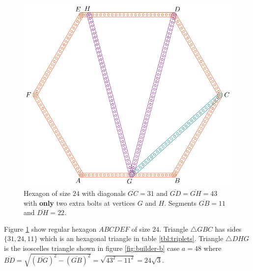 \documentclass[11pt]{article}
\begin{document}
\begin{figure}[H]
\centering
\includegraphics[scale=0.9]{24/hexa-24a}
\caption{Hexagon of size $24$ with diagonals $\overline{GC} = 31$ and $\overline{GD} = \overline{GH} = 43$ with \textbf{only} two extra bolts at vertices $G$ and $H$. Segments $\overline{GB} = 11$ and $\overline{DH} = 22$.}
\label{fig:24a}
\end{figure}

Figure \ref{fig:24a} show regular hexagon $ABCDEF$ of size $24$. Triangle $\triangle{GBC}$ has sides $\{31,24,11\}$ which is an hexagonal triangle in table \ref{tbl:triplets}. Triangle $\triangle{DHG}$ is the isoscelles triangle shown in figure \ref{fig:builder-b} case $a=48$ where $\overline{BD} = \sqrt{(\overline{DG})^2 - (\overline{GB})^2} = \sqrt{43^2 - 11^2} = 24\sqrt3$.
\end{document}

